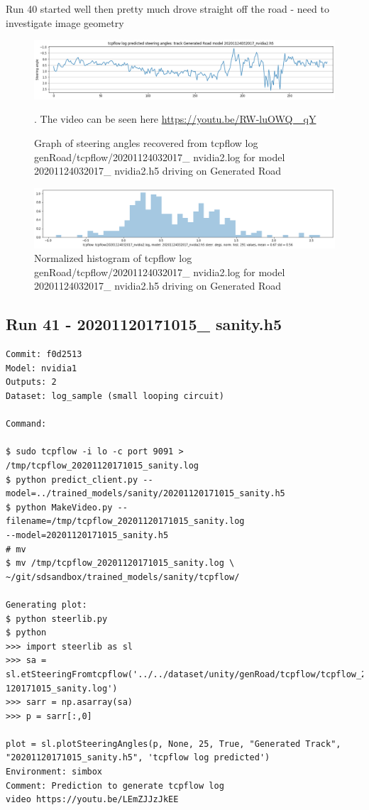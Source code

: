 Run 40 started well then pretty much drove straight off the road - need to investigate image
geometry
\begin{figure}[ht]
 \centering 
 \includegraphics[width=\textwidth]{Figures/tcpflow_20201124032017_nvidia2_graph.png}
 \caption{Graph of steering angles recovered from tcpflow log genRoad/tcpflow/20201124032017\_ nvidia2.log for model 20201124032017\_ nvidia2.h5 driving on Generated Road}. The video can be seen here \href{https://youtu.be/RW-luOWQ\_ qY}{https://youtu.be/RW-luOWQ\_ qY}
 \label{fig:tcpflow_20201124032017_nvidia2_graph}
\end{figure}

\begin{figure}[ht]
 \centering 
 \includegraphics[width=\textwidth]{Figures/tcpflow_20201124032017_nvidia2_bins.png}
 \caption{Normalized histogram of tcpflow log genRoad/tcpflow/20201124032017\_ nvidia2.log for model 20201124032017\_ nvidia2.h5 driving on Generated Road}
 \label{fig:tcpflow_20201124032017_nvidia2_bins} 
\end{figure} 


\subsection{Run 41 - 20201120171015\_ sanity.h5}
\label{app_res:41}
\label{}
\begin{verbatim}
Commit: f0d2513
Model: nvidia1
Outputs: 2
Dataset: log_sample (small looping circuit)

Command: 

$ sudo tcpflow -i lo -c port 9091 > /tmp/tcpflow_20201120171015_sanity.log
$ python predict_client.py --model=../trained_models/sanity/20201120171015_sanity.h5
$ python MakeVideo.py --filename=/tmp/tcpflow_20201120171015_sanity.log
--model=20201120171015_sanity.h5
# mv
$ mv /tmp/tcpflow_20201120171015_sanity.log \ 
~/git/sdsandbox/trained_models/sanity/tcpflow/

Generating plot:
$ python steerlib.py
$ python 
>>> import steerlib as sl
>>> sa = sl.etSteeringFromtcpflow('../../dataset/unity/genRoad/tcpflow/tcpflow_20201
120171015_sanity.log')
>>> sarr = np.asarray(sa)
>>> p = sarr[:,0]

plot = sl.plotSteeringAngles(p, None, 25, True, "Generated Track",
"20201120171015_sanity.h5", 'tcpflow log predicted')
Environment: simbox
Comment: Prediction to generate tcpflow log
video https://youtu.be/LEmZJJzJkEE
\end{verbatim}

